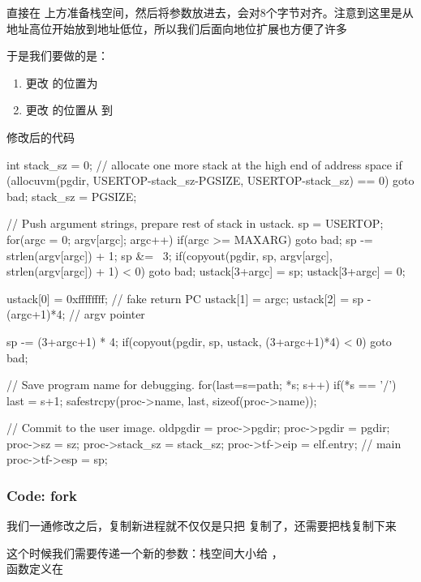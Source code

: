 直接在  上方准备栈空间，然后将参数放进去，会对8个字节对齐。注意到这里是从地址高位开始放到地址低位，所以我们后面向地位扩展也方便了许多

于是我们要做的是：

\begin{enumerate}
    \item 更改  的位置为 
    \item 更改  的位置从  到 
\end{enumerate}

修改后的代码

\begin{ccode}
    int stack_sz = 0;
    // allocate one more stack at the high end of address space
    if (allocuvm(pgdir, USERTOP-stack_sz-PGSIZE, USERTOP-stack_sz) == 0)
        goto bad;
    stack_sz = PGSIZE;

    // Push argument strings, prepare rest of stack in ustack.
    sp = USERTOP;
    for(argc = 0; argv[argc]; argc++) {
        if(argc >= MAXARG)
        goto bad;
        sp -= strlen(argv[argc]) + 1;
        sp &= ~3;
        if(copyout(pgdir, sp, argv[argc], strlen(argv[argc]) + 1) < 0)
        goto bad;
        ustack[3+argc] = sp;
    }
    ustack[3+argc] = 0;

    ustack[0] = 0xffffffff;  // fake return PC
    ustack[1] = argc;
    ustack[2] = sp - (argc+1)*4;  // argv pointer

    sp -= (3+argc+1) * 4;
    if(copyout(pgdir, sp, ustack, (3+argc+1)*4) < 0)
        goto bad;

    // Save program name for debugging.
    for(last=s=path; *s; s++)
        if(*s == '/')
        last = s+1;
    safestrcpy(proc->name, last, sizeof(proc->name));

    // Commit to the user image.
    oldpgdir = proc->pgdir;
    proc->pgdir = pgdir;
    proc->sz = sz;
    proc->stack_sz = stack_sz;
    proc->tf->eip = elf.entry;  // main
    proc->tf->esp = sp;
\end{ccode}

\subsubsection{Code: fork}

我们一通修改之后，复制新进程就不仅仅是只把  复制了，还需要把栈复制下来

这个时候我们需要传递一个新的参数：栈空间大小给 ，
\\ 函数定义在 

